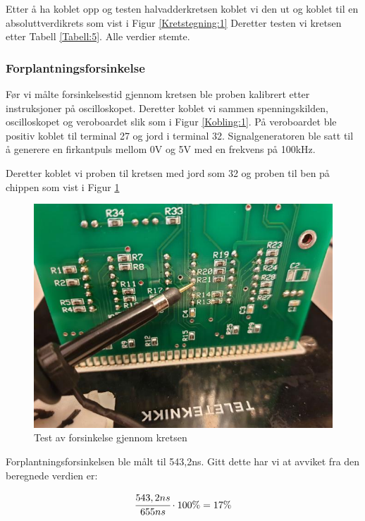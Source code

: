 Etter å ha koblet opp og testen halvadderkretsen koblet vi den ut og koblet til en absoluttverdikrets som vist i Figur \ref{Kretstegning:1}
Deretter testen vi kretsen etter Tabell \ref{Tabell:5}. Alle verdier stemte.

\subsubsection*{Forplantningsforsinkelse}

Før vi målte forsinkelsestid gjennom kretsen ble proben kalibrert etter instruksjoner på oscilloskopet.
Deretter koblet vi sammen spenningskilden, oscilloskopet og veroboardet slik som i Figur \ref{Kobling:1}.
På veroboardet ble positiv koblet til terminal 27 og jord i terminal 32.
Signalgeneratoren ble satt til å generere en firkantpuls mellom 0V og 5V med en frekvens på 100kHz.

Deretter koblet vi proben til kretsen med jord som 32 og proben til ben på chippen som vist i Figur \ref{figur:2}

\begin{figure}[h]
  \includegraphics{Bilder/Probetest1}
  \caption{Test av forsinkelse gjennom kretsen}
  \label{figur:2}
\end{figure}

Forplantningsforsinkelsen ble målt til 543,2ns. Gitt dette har vi at avviket fra den beregnede verdien er:

\begin{displaymath}
  \cfrac{543,2ns}{655ns}\cdot100\%=17\%
\end{displaymath}


